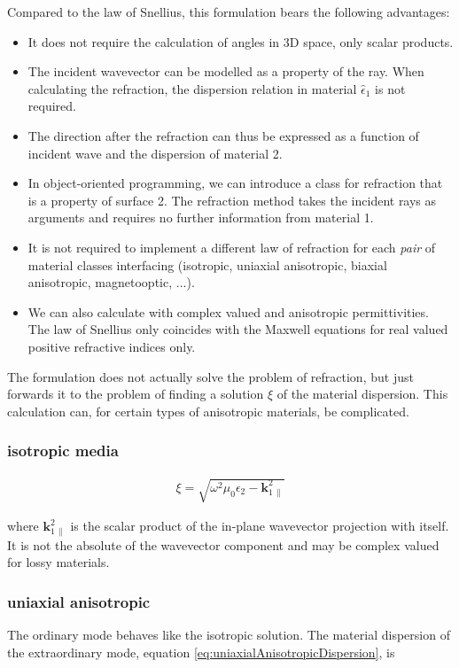 \documentclass[12pt,a4paper,twoside,openright,BCOR10mm,headsepline,titlepage,abstracton,chapterprefix,final]{scrreprt}
\newcommand\Vector[1]{{\mathbf{#1}}}
\newcommand\wavenumber{k}
\newcommand\Wavevector{\Vector{\wavenumber}}
\newcommand\Tensor[1]{\hat{#1}}
\newcommand\permittivity{\Tensor{\epsilon}}
\begin{document}
Compared to the law of Snellius, this formulation bears the following advantages:
\begin{itemize}
 \item It does not require the calculation of angles in 3D space, only scalar products.
 \item The incident wavevector can be modelled as a property of the ray. When calculating the refraction, 
       the dispersion relation in material $\permittivity_1$ is not required.
 \item The direction after the refraction can thus be expressed as a function of incident wave and the dispersion of material 2.
 \item In object-oriented programming, we can introduce a class for refraction that is a property of surface 2.
       The refraction method takes the incident rays as arguments and requires no further information from material 1.
 \item It is not required to implement a different law of refraction for each \emph{pair} of material classes interfacing 
       (isotropic, uniaxial anisotropic, biaxial anisotropic, magnetooptic, ...).
 \item We can also calculate with complex valued and anisotropic permittivities.
 The law of Snellius only coincides with the Maxwell equations for real valued positive refractive indices only.
\end{itemize}
The formulation does not actually solve the problem of refraction, but just forwards it to the problem of finding a solution $\xi$ of the material dispersion. 
This calculation can, for certain types of anisotropic materials, be complicated.

\subsubsection{isotropic media}
\begin{align}
 \xi = \sqrt{\omega^2 \mu_0 \epsilon_2 - \Wavevector_{1\,\parallel}^2}
\end{align}

where $\Wavevector_{1\,\parallel}^2$ is the scalar product of the in-plane wavevector projection with itself.
It is not the absolute of the wavevector component and may be complex valued for lossy materials.


\subsubsection{uniaxial anisotropic}
The ordinary mode behaves like the isotropic solution.
The material dispersion of the extraordinary mode, equation \ref{eq:uniaxialAnisotropicDispersion}, is
\end{document}
